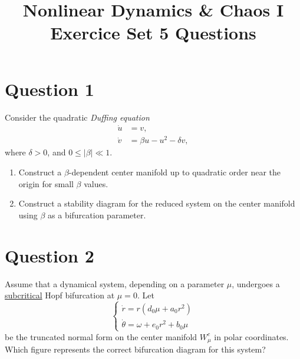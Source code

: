 \documentclass[twoside,10pt,a4paper]{article}
\title{\huge \textbf{Nonlinear Dynamics \& Chaos I \\ \Large Exercice Set 5 Questions}}	%
\author{ }		%
\date{ }	%
\begin{document}
\maketitle

\section*{Question 1}
Consider the quadratic \textit{Duffing equation}
\begin{align*}
	\dot{u} &= v, \\
	\dot{v} &= \beta u - u^2 - \delta v,
\end{align*}
where $\delta > 0$, and $0 \leq |\beta| \ll 1$.

\begin{enumerate}[label=(\alph*)]
	\item Construct a $\beta$-dependent center manifold up to quadratic order near the origin for small $\beta$ values.
	\item Construct a stability diagram for the reduced system on the center manifold using $\beta$ as a bifurcation parameter.
\end{enumerate}


\section*{Question 2}
Assume that a dynamical system, depending on a parameter $\mu$, undergoes a \underline{subcritical} Hopf bifurcation at $\mu = 0$. Let
\begin{equation*}
	\begin{cases}
		\dot{r} = r(d_0 \mu + a_0 r^2) \\
		\dot{\theta} = \omega + e_0 r^2 + b_0 \mu
	\end{cases}
\end{equation*}
be the truncated normal form on the center manifold $W_\mu^c$ in polar coordinates. Which figure represents the correct bifurcation diagram for this system?
\end{document}
